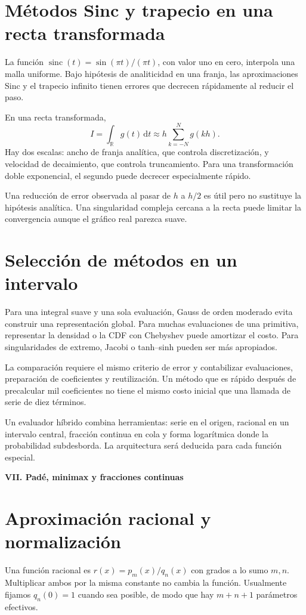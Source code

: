 \documentclass[11pt,a4paper]{article}
\newcommand{\R}{\mathbb R}
\newcommand{\dd}{\,\mathrm d}
\theoremstyle{definition}
\newcommand{\parte}[1]{\par\bigskip\Needspace{8\baselineskip}\begin{center}{\Large\bfseries\color{azul}#1}\end{center}}
\begin{document}
\section{Métodos Sinc y trapecio en una recta transformada}
La función $\operatorname{sinc}(t)=\sin(\pi t)/(\pi t)$, con valor uno en cero, interpola una malla uniforme. Bajo hipótesis de analiticidad en una franja, las aproximaciones Sinc y el trapecio infinito tienen errores que decrecen rápidamente al reducir el paso.

En una recta transformada,
\[
I=\int_\R g(t)\dd t\approx h\sum_{k=-N}^Ng(kh).
\]
Hay dos escalas: ancho de franja analítica, que controla discretización, y velocidad de decaimiento, que controla truncamiento. Para una transformación doble exponencial, el segundo puede decrecer especialmente rápido.

Una reducción de error observada al pasar de $h$ a $h/2$ es útil pero no sustituye la hipótesis analítica. Una singularidad compleja cercana a la recta puede limitar la convergencia aunque el gráfico real parezca suave.

\section{Selección de métodos en un intervalo}
Para una integral suave y una sola evaluación, Gauss de orden moderado evita construir una representación global. Para muchas evaluaciones de una primitiva, representar la densidad o la CDF con Chebyshev puede amortizar el costo. Para singularidades de extremo, Jacobi o tanh--sinh pueden ser más apropiados.

La comparación requiere el mismo criterio de error y contabilizar evaluaciones, preparación de coeficientes y reutilización. Un método que es rápido después de precalcular mil coeficientes no tiene el mismo costo inicial que una llamada de serie de diez términos.

Un evaluador híbrido combina herramientas: serie en el origen, racional en un intervalo central, fracción continua en cola y forma logarítmica donde la probabilidad subdesborda. La arquitectura será deducida para cada función especial.


\parte{VII. Padé, minimax y fracciones continuas}
\section{Aproximación racional y normalización}
Una función racional es $r(x)=p_m(x)/q_n(x)$ con grados a lo sumo $m,n$. Multiplicar ambos por la misma constante no cambia la función. Usualmente fijamos $q_n(0)=1$ cuando sea posible, de modo que hay $m+n+1$ parámetros efectivos.
\end{document}
